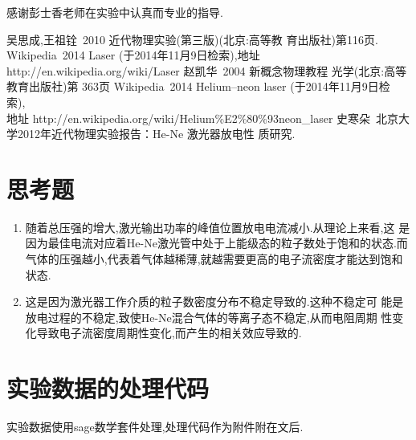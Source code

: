 \documentclass[aps,pre,12pt,preprint,onecolumn,showpacs,showkeys]{revtex4-1}
\begin{document}
感谢彭士香老师在实验中认真而专业的指导.

\begin{thebibliography}{}
 吴思成,王祖铨~2010 近代物理实验(第三版)(北京:高等教
育出版社)第116页. 
 Wikipedia~2014 Laser (于2014年11月9日检索),地址
http://en.wikipedia.org/wiki/Laser
 赵凯华~2004 新概念物理教程 光学(北京:高等教育出版社)第
  363页
 Wikipedia~2014 Helium–neon laser (于2014年11月9日检
  索),\\
地址 http://en.wikipedia.org/wiki/Helium\%E2\%80\%93neon\_laser
 史寒朵~北京大学2012年近代物理实验报告：He-Ne 激光器放电性
质研究. 
\end{thebibliography}
 
\clearpage
\appendix
\section{思考题}
 

\begin{enumerate}
\item 随着总压强的增大,激光输出功率的峰值位置放电电流减小.从理论上来看,这
  是因为最佳电流对应着He-Ne激光管中处于上能级态的粒子数处于饱和的状态.而
  气体的压强越小,代表着气体越稀薄,就越需要更高的电子流密度才能达到饱和
  状态.
\item 这是因为激光器工作介质的粒子数密度分布不稳定导致的.这种不稳定可
  能是放电过程的不稳定,致使He-Ne混合气体的等离子态不稳定,从而电阻周期
  性变化导致电子流密度周期性变化,而产生的相关效应导致的.
\end{enumerate}
 

\section{实验数据的处理代码}

实验数据使用sage数学套件处理,处理代码作为附件附在文后.

\newpage


\end{document}

